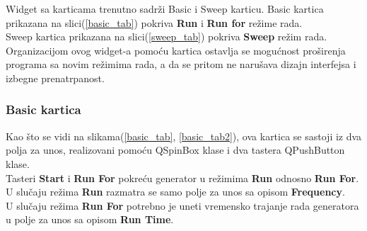 Widget sa karticama trenutno sadrži Basic i Sweep karticu. Basic kartica
prikazana na slici(\ref{basic_tab}) pokriva
\textbf{Run} i \textbf{Run for} režime rada. \\
Sweep kartica prikazana na slici(\ref{sweep_tab}) pokriva \textbf{Sweep}
režim rada. \\

Organizacijom ovog widget-a pomoću kartica ostavlja se mogućnost proširenja programa
sa novim režimima rada, a da se pritom ne narušava dizajn interfejsa i izbegne
prenatrpanost. \\


\subsubsection{Basic kartica}

Kao što se vidi na slikama(\ref{basic_tab}, \ref{basic_tab2}), ova kartica se
sastoji iz dva polja za unos, realizovani pomoću QSpinBox\cite{QSpinBox} klase i
dva tastera QPushButton\cite{QPushButton} klase. \\

Tasteri \textbf{Start} i \textbf{Run For} pokreću generator u režimima \textbf{Run} odnosno \textbf{Run For}. \\
U slučaju režima \textbf{Run} razmatra se samo polje za unos sa opisom
\textbf{Frequency}. \\
U slučaju režima \textbf{Run For} potrebno je uneti vremensko trajanje rada generatora u
polje za unos sa opisom \textbf{Run Time}. \\
\begin{figure}[H]
\end{figure}

\begin{figure}[H]
\end{figure}

